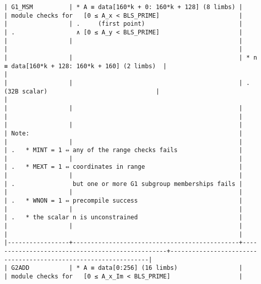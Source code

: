 \documentclass[varwidth=\maxdimen,margin=0.5cm,multi={verbatim}]{standalone}
\begin{document}
\begin{verbatim}
| G1_MSM          | * A ≡ data[160*k + 0: 160*k + 128] (8 limbs) |                                                 | module checks for   [0 ≤ A_x < BLS_PRIME]                      |
|                 | .     (first point)                          |                                                 | .                 ∧ [0 ≤ A_y < BLS_PRIME]                      |
|                 |                                              |                                                 |                                                                |
|                 |                                              | * n ≡ data[160*k + 128: 160*k + 160] (2 limbs)  |                                                                |
|                 |                                              | .     (32B scalar)                              |                                                                |
|                 |                                              |                                                 |                                                                |
|                 |                                              |                                                 | Note:                                                          |
|                 |                                              |                                                 | .   * MINT = 1 ⇔ any of the range checks fails                 |
|                 |                                              |                                                 | .   * MEXT = 1 ⇔ coordinates in range                          |
|                 |                                              |                                                 | .                but one or more G1 subgroup memberships fails |
|                 |                                              |                                                 | .   * WNON = 1 ⇔ precompile success                            |
|                 |                                              |                                                 | .   * the scalar n is unconstrained                            |
|                 |                                              |                                                 |                                                                |
|-----------------+----------------------------------------------+-------------------------------------------------+----------------------------------------------------------------|
| G2ADD           | * A ≡ data[0:256] (16 limbs)                 |                                                 | module checks for   [0 ≤ A_x_Im < BLS_PRIME]                   |

\end{verbatim}
\end{document}
